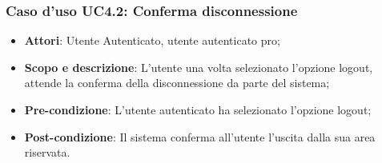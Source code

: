 \subsubsection{Caso d'uso UC4.2: Conferma disconnessione}
	\begin{itemize}
		\item
			\textbf{Attori}: Utente Autenticato, utente autenticato pro;
		\item
			\textbf{Scopo e descrizione}: L'utente una volta selezionato l'opzione logout, attende la conferma della disconnessione da parte del sistema;
 		\item
			\textbf{Pre-condizione}: L'utente autenticato ha selezionato l'opzione logout;
		\item
			\textbf{Post-condizione}: Il sistema conferma all'utente l'uscita dalla sua area riservata.
	\end{itemize}		
	